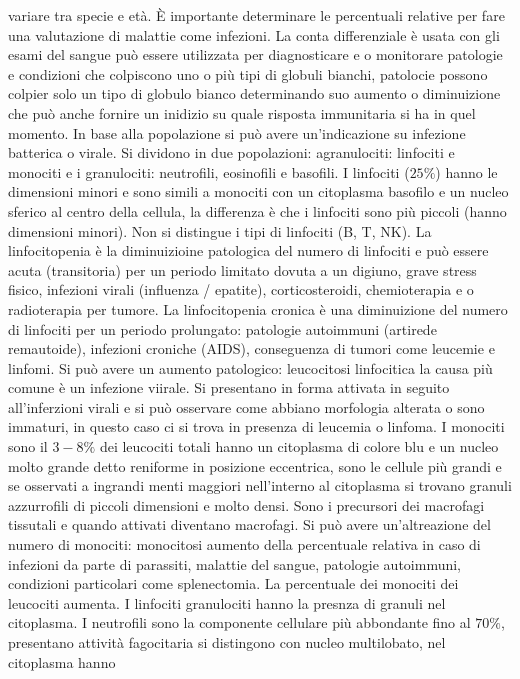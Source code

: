 variare tra specie e et\`a. \`E importante determinare le percentuali relative per fare una valutazione di malattie come infezioni. La conta differenziale \`e usata con gli esami del
sangue pu\`o essere utilizzata per diagnosticare e o monitorare patologie e condizioni che colpiscono uno o pi\`u tipi di globuli bianchi, patolocie possono colpier solo un tipo di 
globulo bianco determinando suo aumento o diminuizione che pu\`o anche fornire un inidizio su quale risposta immunitaria si ha in quel momento. In base alla popolazione si pu\`o avere
un'indicazione su infezione batterica o virale. Si dividono in due popolazioni: agranulociti: linfociti e monociti e i granulociti: neutrofili, eosinofili e basofili. 
I linfociti ($25\%$) hanno le dimensioni minori e sono simili a monociti con un citoplasma basofilo e un nucleo sferico al centro della cellula, la differenza \`e che i linfociti sono
pi\`u piccoli (hanno dimensioni minori). Non si distingue i tipi di linfociti (B, T, NK). La linfocitopenia \`e la diminuizioine patologica del numero di linfociti e pu\`o essere 
acuta (transitoria) per un periodo limitato dovuta a un digiuno, grave stress fisico, infezioni virali (influenza / epatite), corticosteroidi, chemioterapia e o radioterapia per tumore.
La linfocitopenia cronica \`e una diminuizione del numero di linfociti per un periodo prolungato: patologie autoimmuni (artirede remautoide), infezioni croniche (AIDS), conseguenza di 
tumori come leucemie e linfomi. Si pu\`o avere un aumento patologico: leucocitosi linfocitica la causa pi\`u comune \`e un infezione viirale. Si presentano in forma attivata in seguito 
all'inferzioni virali e si pu\`o osservare come abbiano morfologia alterata o sono immaturi, in questo caso ci si trova in presenza di leucemia o linfoma.
I monociti sono il $3-8\%$ dei leucociti totali hanno un citoplasma di colore blu e un nucleo molto grande detto reniforme in posizione eccentrica, sono le cellule pi\`u grandi e se
osservati a ingrandi menti maggiori nell'interno al citoplasma si trovano granuli azzurrofili di piccoli dimensioni e molto densi. Sono i precursori dei macrofagi tissutali e quando
attivati diventano macrofagi. Si pu\`o avere un'altreazione del numero di monociti: monocitosi aumento della percentuale relativa in caso di infezioni da parte di parassiti, malattie
del sangue, patologie autoimmuni, condizioni particolari come splenectomia. La percentuale dei monociti dei leucociti aumenta. I linfociti granulociti hanno la presnza di granuli 
nel citoplasma. I neutrofili sono la componente cellulare pi\`u abbondante fino al $70\%$, presentano attivit\`a fagocitaria si distingono con nucleo multilobato, nel citoplasma hanno
